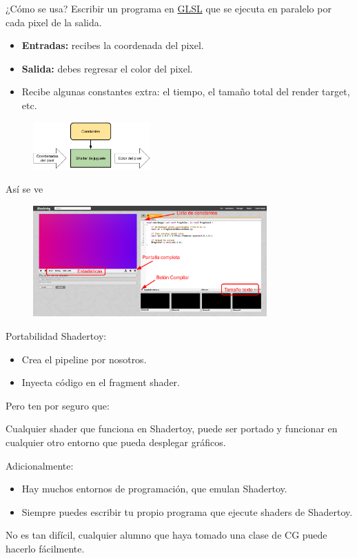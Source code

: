 \begin{frame}{¿Cómo se usa?}
Escribir un programa en \href{https://www.khronos.org/opengl/wiki/Core_Language_(GLSL)}{GLSL} que se ejecuta en paralelo por cada pixel de la salida.
\begin{itemize}
    \item \textbf{Entradas:} recibes la coordenada del pixel.
    \item \textbf{Salida:} debes regresar el color del pixel.
    \item Recibe algunas constantes extra: el tiempo, el tamaño total del render target, etc.
\end{itemize}
\begin{figure}[htp]
  \centering
  \includegraphics[width=0.4\textwidth]{img/SimpleShaderToy}
\end{figure}
\end{frame}

\begin{frame}{Así se ve}
\begin{figure}[htp]
  \centering
  \includegraphics[width=0.8\textwidth]{img/ShaderToyUI}
\end{figure}
\end{frame}

\begin{frame}{Portabilidad}
Shadertoy:
\begin{itemize}
    \item Crea el pipeline por nosotros.
    \item Inyecta código en el fragment shader.
\end{itemize}
Pero ten por seguro que:
\begin{block}{}
    Cualquier shader que funciona en Shadertoy, puede ser \alert{portado} y funcionar en cualquier otro entorno que pueda desplegar gráficos.
\end{block}
Adicionalmente:
\begin{itemize}{}
    \item Hay muchos entornos de programación, que emulan Shadertoy.
    \item Siempre puedes escribir tu propio programa que ejecute shaders de Shadertoy.
\end{itemize}
\begin{block}{}
    No es tan difícil, cualquier alumno que haya tomado una clase de CG puede hacerlo fácilmente.
\end{block}
\end{frame}
